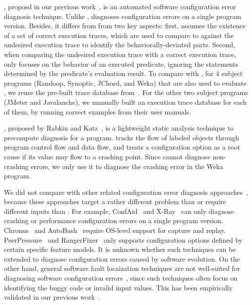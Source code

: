 \prevtool, proposd in our previous work~\cite{}, is an automated
software configuration error diagnosis technique. Unlike \ourtool,
\prevtool diagnoses configuration errors on a single program version.
Besides, it differs from \ourtool from two key aspects:
first, \prevtool assumes the existence of a set of correct execution
traces, which are used to compare to against the undesired
execution trace to identify the behaviorally-deviated parts.
Second, when comparing the undesired execution trace with a
correct execution trace, \prevtool only focuses on the behavior
of an executed predicate, ignoring the statements determined
by the predicate's evaluation result. To compare \ourtool with
\prevtool, for 4 subject programs (Randoop, Synoptic, JChord, and
Weka) that are also used
to evaluate \prevtool, we reuse the pre-built trace database
from~\cite{}. For the other two subject programs (JMeter and
Javalanche), we manually built an execution trace database for each
of them, by running correct examples from their user manuals.

\conftool, proposed by Rabkin and Katz~\cite{}, is a lightweight
static analysis technique to precompute diagnosis for a program.
\conftool tracks the flow of labeled objects through 
program control flow and data flow, and treats a configuration option
as a root cause if its value may flow to a crashing point.
Since \conftool cannot diagnose non-crashing errors, we only use
it to diagnose the crashing error in the Weka program.



We did not compare \ourtool with other related
configuration error diagnosis approaches~\cite{Attariyan:2010:ACT,
xray, Whitaker:2004:CDS, Su:2007:AIC, Wang:2004:AMT, rangefix},
because these approaches target a rather
different problem than \ourtool or require different
inputs than \ourtool. For example, ConfAid~\cite{Attariyan:2010:ACT}
and X-Ray~\cite{xray} can only diagnose crashing
or performance configuration errors on a single
program version. Chronus~\cite{Whitaker:2004:CDS}
and AutoBash~\cite{Su:2007:AIC}
require OS-level support for capture and replay.
PeerPressure~\cite{Wang:2004:AMT} and RangerFixer~\cite{rangefix} only
supports configuration options defined by certain
specific feature models. It is unknown whether
such techniques can be extended to diagnose configuration
errors caused by software evolution. On the other
hand, general software fault locaization techniques
are not well-suited for diagnosing software
configuration errors~\cite{Jones:2002}, since such techniques
often focus on identifying the buggy code or
invalid input values. This has been empirically
validated in our previous work~\cite{Zhang:2013:ADS}.


